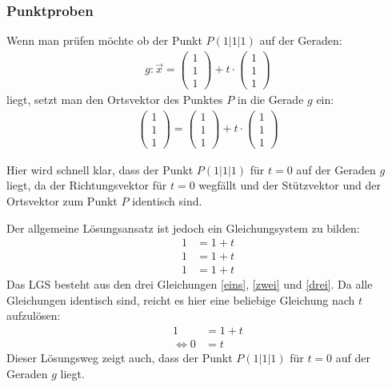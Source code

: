 \subsubsection{Punktproben}
\begin{flushleft}
Wenn man prüfen möchte ob der Punkt $P(1|1|1)$ auf der Geraden:
\begin{align}
    g\colon\vec{x}=\begin{pmatrix} 1 \\ 1 \\ 1 \end{pmatrix}+t\cdot\begin{pmatrix} 1 \\ 1 \\ 1 \end{pmatrix}
\end{align}
liegt, setzt man den Ortsvektor des Punktes $P$ in die Gerade $g$ ein:
\begin{align}
    \begin{pmatrix} 1 \\ 1 \\ 1 \end{pmatrix}=\begin{pmatrix} 1 \\ 1 \\ 1 \end{pmatrix}+t\cdot\begin{pmatrix} 1 \\ 1 \\ 1 \end{pmatrix}
\end{align}

Hier wird schnell klar, dass der Punkt $P(1|1|1)$ für $t=0$ auf der Geraden $g$ liegt, da der Richtungsvektor für $t=0$ wegfällt und der Stützvektor und der Ortsvektor zum Punkt $P$ identisch sind.

Der allgemeine Lösungsansatz ist jedoch ein Gleichungsystem zu bilden:
\begin{align}
    1&=1+t \label{eins} \\
    1&=1+t \label{zwei} \\
    1&=1+t \label{drei}
\end{align}
Das LGS besteht aus den drei Gleichungen \eqref{eins}, \eqref{zwei} und \eqref{drei}.
Da alle Gleichungen identisch sind, reicht es hier eine beliebige Gleichung nach $t$ aufzulösen:
\begin{align}
    1&=1+t \\
    \Leftrightarrow 0&=t
\end{align}
Dieser Lösungsweg zeigt auch, dass der Punkt $P(1|1|1)$ für $t=0$ auf der Geraden $g$ liegt.
\end{flushleft}

